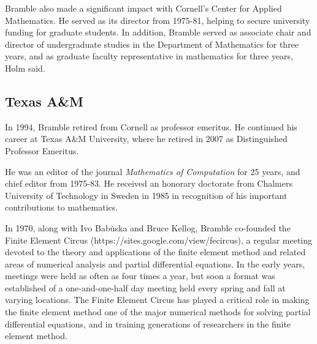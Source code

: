 \documentclass[CJK,11pt]{amsart}
\theoremstyle{definition}
\begin{document}
\begin{CJK*}{UTF8}{gbsn}
Bramble also made a significant impact with Cornell's Center for Applied Mathematics. He served as its director from 1975-81, helping to secure university funding for graduate students.  In addition, Bramble served as associate chair and director of undergraduate studies in the Department of Mathematics for three years, and as graduate faculty representative in mathematics for three years, Holm said.

\subsection{Texas A\&M}
In 1994, Bramble retired from Cornell as professor emeritus. He continued his career at Texas A\&M University, where he retired in 2007 as Distinguished Professor Emeritus. 

He was an editor of the journal {\it Mathematics of Computation} for 25 years, and chief editor from 1975-83. He received an honorary doctorate from Chalmers University of Technology in Sweden in 1985 in recognition of his important contributions to mathematics.

In 1970, along with Ivo Bab{\u u}ska and Bruce Kellog, Bramble
co-founded the Finite Element Circus
(https://sites.google.com/view/fecircus), a regular meeting devoted to
the theory and applications of the finite element method and related
areas of numerical analysis and partial differential equations.  In
the early years, meetings were held as often as four times a year, but
soon a format was established of a one-and-one-half day meeting held
every spring and fall at varying locations.  The Finite Element Circus
has played a critical role in making the finite element method one
of the major numerical methods for solving partial differential
equations, and in training generations of researchers in the finite
element method.


\end{CJK*}
\end{document}
